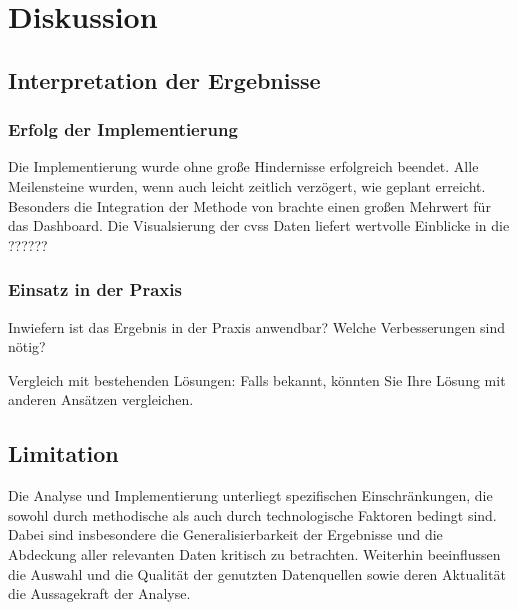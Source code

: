 \chapter{Diskussion}
\label{chap:diskussion}
\section{Interpretation der Ergebnisse}
\label{sec:interpretation}
\subsection{Erfolg der Implementierung}
Die Implementierung wurde ohne große Hindernisse erfolgreich beendet. Alle Meilensteine wurden, wenn auch leicht zeitlich verzögert, wie geplant erreicht. Besonders die Integration der Methode von \citeauthor{klementSecuring6GTransition2024} brachte einen großen Mehrwert für das Dashboard. Die Visualsierung der \gls{cvss} Daten liefert wertvolle Einblicke in die ??????
\subsection{Einsatz in der Praxis}
Inwiefern ist das Ergebnis in der Praxis anwendbar? Welche Verbesserungen sind nötig?

Vergleich mit bestehenden Lösungen:
Falls bekannt, könnten Sie Ihre Lösung mit anderen Ansätzen vergleichen.

\section{Limitation}
\label{sec:limitationen}
Die Analyse und Implementierung unterliegt spezifischen Einschränkungen, die sowohl durch methodische als auch durch technologische Faktoren bedingt sind. Dabei sind insbesondere die Generalisierbarkeit der Ergebnisse und die Abdeckung aller relevanten Daten kritisch zu betrachten.  Weiterhin beeinflussen die Auswahl und die Qualität der genutzten Datenquellen sowie deren Aktualität die Aussagekraft der Analyse. 
